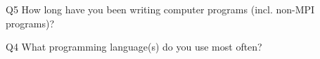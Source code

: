 \begin{description}%
\item{Q5} How long have you been writing computer programs (incl. non-MPI programs)?%
\item{Q4} What programming language(s) do you use most often?%
\end{description}%
